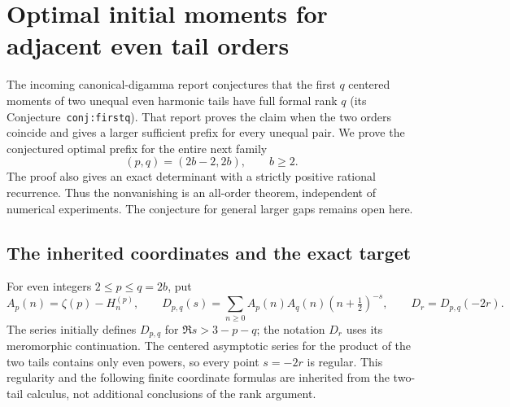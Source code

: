 
\section{Optimal initial moments for adjacent even tail orders}
\label{ar:section}

The incoming canonical-digamma report \cite{Fifth} conjectures that the first $q$
centered moments of two unequal even harmonic tails have full formal
rank $q$ (its Conjecture~\texttt{conj:firstq}). That report proves the
claim when the two orders coincide and gives a larger sufficient prefix
for every unequal pair. We prove the conjectured optimal prefix for the
entire next family
\[
                 (p,q)=(2b-2,2b),\qquad b\ge2.
\]
The proof also gives an exact determinant with a strictly positive
rational recurrence. Thus the nonvanishing is an all-order theorem,
independent of numerical experiments. The conjecture for general larger
gaps remains open here.

\subsection{The inherited coordinates and the exact target}

For even integers $2\le p\le q=2b$, put
\[
 A_p(n)=\zeta(p)-H_n^{(p)},\qquad
 D_{p,q}(s)=\sum_{n\ge0}
     A_p(n)A_q(n)(n+\tfrac12)^{-s},\qquad
 D_r=D_{p,q}(-2r).
\]
The series initially defines $D_{p,q}$ for
$\Re s>3-p-q$; the notation $D_r$ uses its meromorphic continuation.
The centered asymptotic series for the product of the two tails contains
only even powers, so every point $s=-2r$ is regular. This regularity and
the following finite coordinate formulas are inherited from the two-tail
calculus, not additional conclusions of the rank argument.

